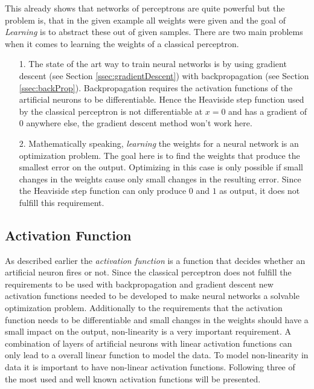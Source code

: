 This already shows that networks of perceptrons are quite powerful but the problem is, that in the given example all weights were given and the goal of \emph{Learning} is to abstract these out of given samples.
There are two main problems when it comes to learning the weights of a classical perceptron.
\begin{itemize}
\item[1.] The state of the art way to train neural networks is by using gradient descent (see Section \ref{ssec:gradientDescent}) with backpropagation (see Section \ref{ssec:backProp}).
Backpropagation requires the activation functions of the artificial neurons to be differentiable. 
Hence the Heaviside step function used by the classical perceptron is not differentiable at $x = 0$ and has a gradient of $0$ anywhere else, the gradient descent method won't work here.
\item[2.] Mathematically speaking, \emph{learning} the weights for a neural network is an optimization problem. 
The goal here is to find the weights that produce the smallest error on the output.
Optimizing in this case is only possible if small changes in the weights cause only small changes in the resulting error.
Since the Heaviside step function can only produce $0$ and $1$ as output, it does not fulfill this requirement.
\end{itemize}

\subsection{Activation Function}
As described earlier the \emph{activation function} is a function that decides whether an artificial neuron fires or not. 
Since the classical perceptron does not fulfill the requirements to be used with backpropagation and gradient descent new activation functions needed to be developed to make neural networks a solvable optimization problem.
Additionally to the requirements that the activation function needs to be differentiable and small changes in the weights should have a small impact on the output, non-linearity is a very important requirement.
A combination of layers of artificial neurons with linear activation functions can only lead to a overall linear function to model the data.
To model non-linearity in data it is important to have non-linear activation functions.
Following three of the most used and well known activation functions will be presented.
